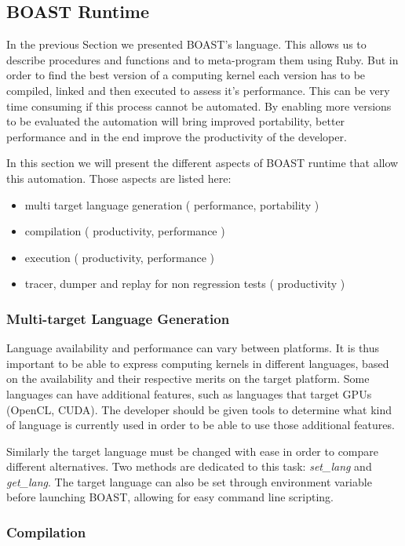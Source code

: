 \documentclass[review]{elsarticle}
\begin{document}
  \subsection{BOAST Runtime}

In the previous Section we presented BOAST's language. This allows us to
describe procedures and functions and to meta-program them using Ruby. But in
order to find the best version of a computing kernel each version has to be
compiled, linked and then executed to assess it's performance. This can be very
time consuming if this process cannot be automated. By enabling more versions to
be evaluated the automation will bring improved portability, better performance
and in the end improve the productivity of the developer.

In this section we will present the different aspects of BOAST runtime that
allow this automation. Those aspects are listed here:
  \begin{itemize}
  \item multi target language generation ( performance, portability )
  \item compilation ( productivity, performance )
  \item execution ( productivity, performance )
  \item tracer, dumper and replay for non regression tests ( productivity )
  \end{itemize}

  \subsubsection{Multi-target Language Generation}

Language availability and performance can vary between platforms. It is thus
important to be able to express computing kernels in different languages, based
on the availability and their respective merits on the target platform. Some
languages can have additional features, such as languages that target GPUs
(OpenCL, CUDA). The developer should be given tools to determine what kind of
language is currently used in order to be able to use those additional features.

Similarly the target language must be changed with ease in order to compare
different alternatives. Two methods are dedicated to this task: \emph{set\_lang}
and \emph{get\_lang}. The target language can also be set through environment
variable before launching BOAST, allowing for easy command line scripting.

  \subsubsection{Compilation}
\end{document}
